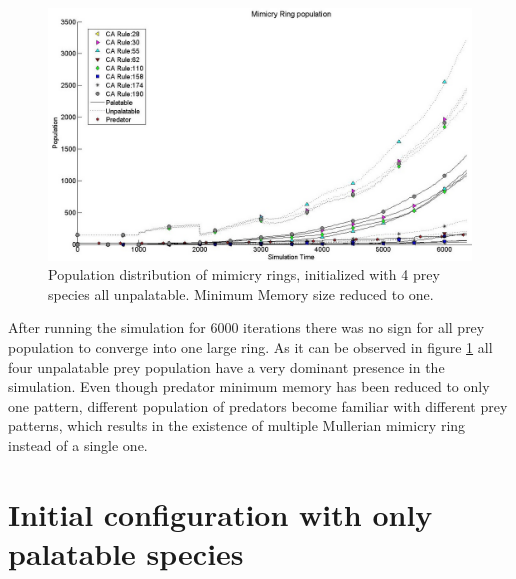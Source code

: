 \begin{figure}[H]
	\centering
	\includegraphics[scale=0.45]{images/simTime6k-4Prey-unp-1-mem}
	\caption[Population distribution of mimicry rings(4 prey, all unpalatable but reduced predator memory)]{Population distribution of mimicry rings, initialized with 4 prey species all unpalatable. Minimum Memory size reduced to one.}
	\label{fig:plot-4-prey-unp-1-mem}
\end{figure}

After running the simulation for 6000 iterations there was no sign for all prey population to converge into one large ring. As it can be observed in figure \ref{fig:plot-4-prey-unp-1-mem} all four unpalatable prey population have a very dominant presence in the simulation. Even though predator minimum memory has been reduced to only one pattern, different population of predators become familiar with different prey patterns, which results in the existence of multiple Mullerian mimicry ring instead of a single one.

\section{Initial configuration with only palatable species}
\label{sec:init-only-palatable-species}

